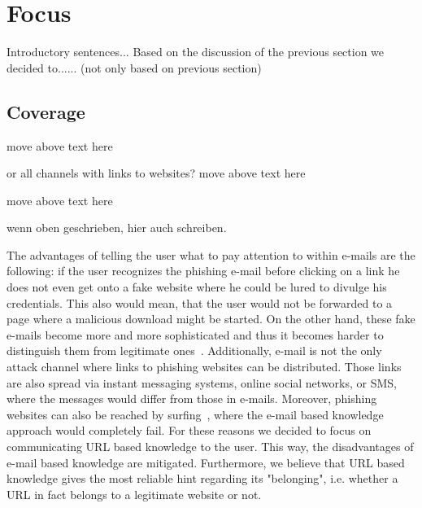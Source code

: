 \section{Focus}
\label{s:assumptions}
Introductory sentences...
Based on the discussion of the previous section we decided to...... (not only based on previous section)

\subsection{Coverage}
\begin{description}[leftmargin=0cm]
	\item[Phishing Technique - Deceptive Phishing] move above text here
	\item[Attack Channel - E-Mail] or all channels with links to websites? move above text here
	\item[Variation of Phishing - Mass Phishing] move above text here
	\item[Game and Quiz Based Learning] wenn oben geschrieben, hier auch schreiben.			
	\item[URL Based Knowledge] The advantages of telling the user what to pay attention to within e-mails are the following: if the user recognizes the phishing e-mail before clicking on a link he does not even get onto a fake website where he could be lured to divulge his credentials. This also would mean, that the user would not be forwarded to a page where a malicious download might be started. On the other hand, these fake e-mails become more and more sophisticated and thus it becomes harder to distinguish them from legitimate ones~\cite{microsoftphishing, spamfighter}. Additionally, e-mail is not the only attack channel where links to phishing websites can be distributed.  Those links are also spread via instant messaging systems, online social networks, or SMS, where the messages would differ from those in e-mails. Moreover, phishing websites can also be reached by surfing~\cite{kasperskyreport2013}, where the e-mail based knowledge approach would completely fail. For these reasons we decided to focus on communicating URL based knowledge to the user. This way, the disadvantages of e-mail based knowledge are mitigated. Furthermore, we believe that URL based knowledge gives the most reliable hint regarding its "belonging", i.e. whether a URL in fact belongs to a legitimate website or not.

\end{description}
